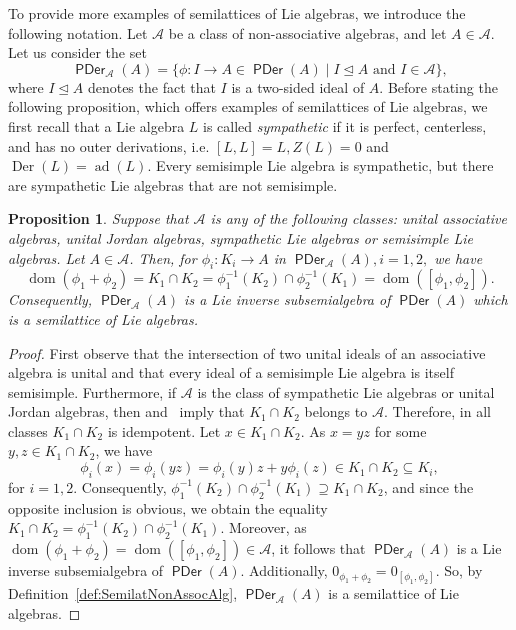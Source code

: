 \documentclass{amsart}
\newcommand{\0}{{\vartheta}}
\newtheorem{prop}[thm]{Proposition}
\theoremstyle{definition}
\theoremstyle{remark}
\numberwithin{equation}{section}
\newtheorem*{Theorem A}{\textbf{Theorem A}}
\newtheorem*{Corollary E}{\textbf{Corollary E}}
\newtheorem*{Corollary F}{\textbf{Corollary F}}
\newtheorem*{Theorem B}{\textbf{Theorem B}}
\newtheorem*{Theorem C}{\textbf{Theorem C}}
\newtheorem*{Theorem D}{\textbf{Theorem B}}
\newtheorem*{p a}{\textbf{Proof of  Theorem A}}
\newtheorem*{p b}{\textbf{Proof of Theorem B}}
\newtheorem*{p c}{\textbf{Proof of  Theorem C}}
\newtheorem*{p d}{\textbf{Proof of  Theorem D}}
\DeclareMathOperator{\der}{Der}
\DeclareMathOperator{\dom}{dom}
\DeclareMathOperator{\pde}{\textsf{PDer}}
\DeclareMathOperator{\ad}{ad}
\begin{document}
To provide more examples of semilattices of Lie algebras, we introduce the following notation. Let $\mathcal{A}$ be a class of non-associative algebras, and let $A\in \mathcal A$. Let us consider the set  
$$\pde_{\mathcal A}(A)=\{\phi: I\to A\in \pde(A)\mid I\unlhd A \mbox{ and } I\in\mathcal{A}\},$$  where
$I\unlhd A$ denotes the fact that $I$ is a two-sided ideal of $A.$
Before stating the following proposition, which offers examples of semilattices of Lie algebras, we first recall that a Lie algebra $L$ is called {\em sympathetic} if it is perfect, centerless, and has no outer derivations, i.e. $[L,L]=L, Z(L)=0$ and $\der(L)=\ad (L)$. Every semisimple Lie algebra is sympathetic, but there are sympathetic Lie algebras that are not semisimple. 

\begin{prop}\label{u1}
Suppose that $\mathcal A$ is any of the following classes: unital associative algebras, unital Jordan algebras,  sympathetic Lie algebras or semisimple Lie algebras.  Let $A\in \mathcal A$. Then, for  $\phi_i:K_i\rightarrow A$ in $ \pde_{\mathcal{A}}(A), i=1,2,$ we have 
$$\dom(\phi_1+\phi_2)=K_1\cap K_2=\phi_1^{-1}(K_2)\cap \phi_2^{-1}(K_1)=\dom ([\phi_1,\phi_2]).$$
Consequently, $\pde_{\mathcal{A}}(A)$ is a  Lie inverse subsemialgebra of $\pde(A)$ which is a semilattice of Lie algebras. 
\end{prop}
\begin{proof}
First observe that the intersection of two unital ideals of an associative algebra is unital and that every ideal of a semisimple Lie algebra is itself semisimple. Furthermore, if $\mathcal{A}$ is the class of sympathetic Lie algebras or unital Jordan algebras, then  \cite[Corollary 2.11]{Cortes2023} and~\cite[Proposition 2.14(1)]{Cortes2023} imply that $K_1\cap K_2$ belongs to $\mathcal{A}$. Therefore, in all classes $K_1\cap K_2$ is idempotent. Let $x\in K_1\cap K_2.$ As $x=yz$ for some $y,z\in K_1\cap K_2$, we have
$$\phi_i(x)=\phi_i(yz)=\phi_i(y)z+y\phi_i(z)\in K_1\cap K_2\subseteq K_i,$$ for $i=1,2.$  Consequently, $\phi_1^{-1}(K_2)\cap \phi_2^{-1}(K_1)\supseteq K_1\cap K_2$, and since the opposite inclusion is obvious, we obtain the equality $K_1\cap K_2=\phi_1^{-1}(K_2)\cap \phi_2^{-1}(K_1)$. Moreover, as  $\dom(\phi_1+\phi_2)=\dom([\phi_1,\phi_2])\in \mathcal{A}$, it follows that $\pde_{\mathcal{A}}(A)$ is a  Lie inverse subsemialgebra of $\pde(A)$. Additionally,  $0_{\phi_1+\phi_2}=0_{[\phi_1,\phi_2]}$. So, by Definition~\ref{def:SemilatNonAssocAlg},   $\pde_{\mathcal{A}}(A)$ is a semilattice of Lie algebras.
\end{proof}
\end{document}
